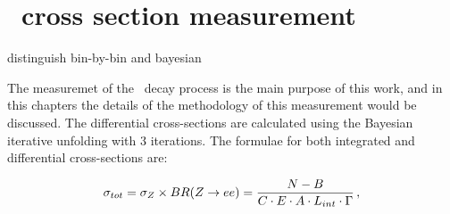 \chapter{\Zee\ cross section measurement}
\label{sec:ZeeCrossSec}
\tbu distinguish bin-by-bin and bayesian


The measuremet of the \Zee\ decay process is the main purpose of this work, and in this chapters the details of the methodology of this measurement would be discussed. The differential cross-sections are calculated using the Bayesian iterative unfolding with 3 iterations. The formulae for both integrated and differential cross-sections are:

\begin{equation}
\sigma_{tot} = \sigma_{Z} \times BR(Z \rightarrow ee) = \frac{N - B}{C \cdot E \cdot A \cdot L_{int}  \cdot \Gamma}\,,
\end{equation}

